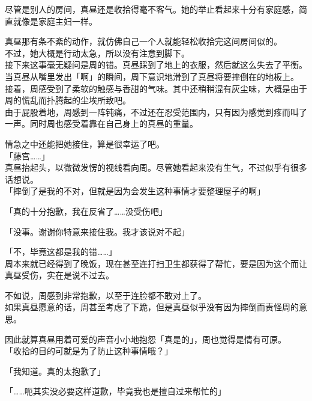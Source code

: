 尽管是别人的房间，真昼还是收拾得毫不客气。她的举止看起来十分有家庭感，简直就像是家庭主妇一样。

真昼那有条不紊的动作，就仿佛自己一个人就能轻松收拾完这间房间似的。\\

不过，她大概是行动太急，所以没有注意到脚下。\\

接下来这事毫无疑问是周的错。真昼踩到了地上的衣服，然后就这么失去了平衡。\\

当真昼从嘴里发出「啊」的瞬间，周下意识地滑到了真昼将要摔倒在的地板上。\\

接着，周感受到了柔软的触感与香甜的气味。其中还稍稍混有灰尘味，大概是由于周的慌乱而扑腾起的尘埃所致吧。\\

由于屁股着地，周感到一阵钝痛，不过还在忍受范围内，只有因为感觉到疼而叫了一声。同时周也感受着靠在自己身上的真昼的重量。

情急之中还能把她接住，算是很幸运了吧。\\

「藤宫……」\\

真昼抬起头，以微微发愣的视线看向周。尽管她看起来没有生气，不过似乎有很多话想说。\\

「摔倒了是我的不对，但就是因为会发生这种事情才要整理屋子的啊」

「真的十分抱歉，我在反省了……没受伤吧」

「没事。谢谢你特意来接住我。我才该说对不起」

「不，毕竟这都是我的错……」\\

周本来就已经得到了晚饭，现在甚至连打扫卫生都获得了帮忙，要是因为这个而让真昼受伤，实在是说不过去。

不如说，周感到非常抱歉，以至于连脸都不敢对上了。\\

如果真昼愿意的话，周甚至考虑了下跪，但是真昼似乎没有因为摔倒而责怪周的意思。

因此就算真昼用着可爱的声音小小地抱怨「真是的」，周也觉得是情有可原。\\

「收拾的目的可就是为了防止这种事情哦？」

「我知道。真的太抱歉了」

「……呃其实没必要这样道歉，毕竟我也是擅自过来帮忙的」\\

